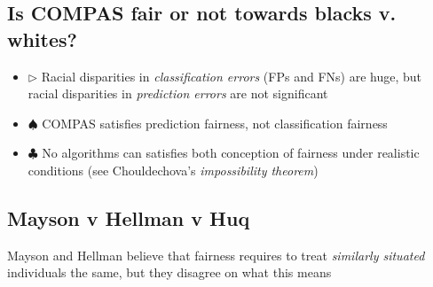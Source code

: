 \documentclass{tufte-handout}
\begin{document}
\subsection{ Is COMPAS fair or not towards blacks v. whites?}

\begin{itemize}

\item[] $\triangleright$ Racial disparities in \textit{classification errors} (FPs and FNs) are huge, but racial disparities in \textit{prediction errors} are not significant  


\item[] $\spadesuit$ COMPAS satisfies prediction fairness, not classification fairness

\item[] $\clubsuit$ No algorithms can satisfies both conception of fairness under realistic conditions (see Chouldechova's \textit{impossibility theorem}) 

\end{itemize}



\subsection{Mayson v Hellman v Huq} %


Mayson and Hellman believe that fairness requires to treat \textit{similarly situated} individuals the same, but they disagree 
on what this means
\end{document}
